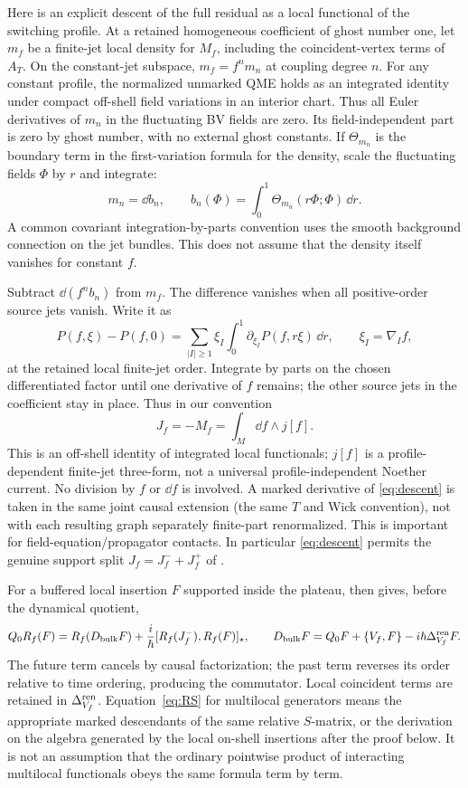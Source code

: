 Here is an explicit descent of the full residual as a local functional of the switching profile. At a retained homogeneous coefficient of ghost number one, let \(m_f\) be a finite-jet local density for \(M_f\), including the coincident-vertex terms of \(A_T\). On the constant-jet subspace, \(m_f=f^n m_n\) at coupling degree \(n\). For any constant profile, the normalized unmarked QME holds as an integrated identity under compact off-shell field variations in an interior chart. Thus all Euler derivatives of \(m_n\) in the fluctuating BV fields are zero. Its field-independent part is zero by ghost number, with no external ghost constants. If \(\Theta_{m_n}\) is the boundary term in the first-variation formula for the density, scale the fluctuating fields \(\Phi\) by \(r\) and integrate:
\[
        m_n=\dd b_n,\qquad
        b_n(\Phi)=\int_0^1\Theta_{m_n}(r\Phi;\Phi)\,\dd r .
\]
A common covariant integration-by-parts convention uses the smooth background connection on the jet bundles. This does not assume that the density itself vanishes for constant \(f\).

Subtract \(\dd(f^n b_n)\) from \(m_f\). The difference vanishes when all positive-order source jets vanish. Write it as
\[
 P(f,\xi)-P(f,0)
     =\sum_{|I|\geq1}\xi_I\int_0^1
                      \partial_{\xi_I} P(f,r\xi)\,\dd r ,
       \qquad \xi_I=\nabla_I f,
\]
at the retained local finite-jet order. Integrate by parts on the chosen differentiated factor until one derivative of \(f\) remains; the other source jets in the coefficient stay in place. Thus in our convention
\begin{equation}
      J_f=-M_f=\int_M \dd f\wedge j[f] .
      \label{eq:descent}
\end{equation}
This is an off-shell identity of integrated local functionals; \(j[f]\) is a profile-dependent finite-jet three-form, not a universal profile-independent Noether current. No division by \(f\) or \(\dd f\) is involved. A marked derivative of \eqref{eq:descent} is taken in the same joint causal extension (the same \(T\) and Wick convention), not with each resulting graph separately finite-part renormalized. This is important for field-equation/propagator contacts. In particular \eqref{eq:descent} permits the genuine support split \(J_f=J_f^-+J_f^+\) of \cite[Remark~4.6, Lemma~5.1]{RS}.

For a buffered local insertion \(F\) supported inside the plateau, \cite[Eq.~(37)]{RS} then gives, before the dynamical quotient,
\begin{equation}
 Q_0 R_f(F)
   =R_f(D_{\mathrm{bulk}} F)+\frac{i}{\hbar}[R_f(J_f^-),R_f(F)]_{\star},
 \qquad
 D_{\mathrm{bulk}} F=Q_0F+\{V_f,F\}-i\hbar \Delta_{V_f}^{\rm ren}F .
 \label{eq:RS}
\end{equation}
The future term cancels by causal factorization; the past term reverses its order relative to time ordering, producing the commutator. Local coincident terms are retained in \(\Delta_{V_f}^{\rm ren}\). Equation~\eqref{eq:RS} for multilocal generators means the appropriate marked descendants of the same relative \(S\)-matrix, or the derivation on the algebra generated by the local on-shell insertions after the proof below. It is not an assumption that the ordinary pointwise product of interacting multilocal functionals obeys the same formula term by term.


